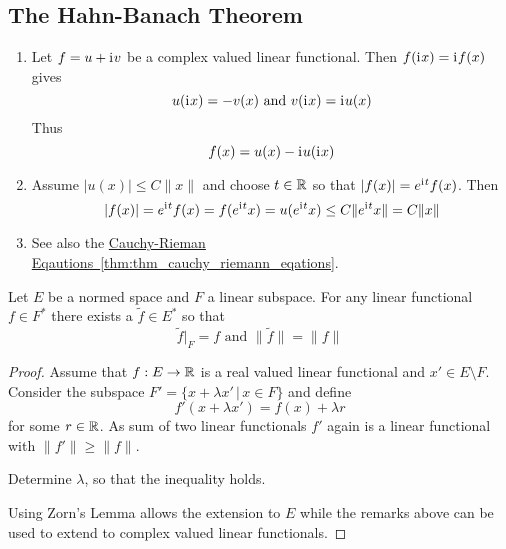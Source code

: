 \subsection{The Hahn-Banach Theorem}
\bigskip

\begin{remarks}
    \hfill
    \begin{enumerate}
        \item Let \( f = u + \mathrm{i}\mkern1mu v\) be a complex valued linear functional.
              Then \( f(\mathrm{i}\mkern1mu x) = \mathrm{i}\mkern1mu f(x) \) gives
              \[
                  u(\mathrm{i}\mkern1mu x) = -v(x) \text{ and } v(\mathrm{i}\mkern1mu x) = \mathrm{i}\mkern1mu u(x)
              \]
              Thus
              \[
                  f(x) = u(x) - \mathrm{i}\mkern1mu u(\mathrm{i}\mkern1mu x)
              \]
        \item Assume \( |u(x)| \le C\|x\| \) and choose \( t \in \mathbb{R} \) so that \( |f(x)| = e^{\mathrm{i}\mkern1mu t}f(x) \).
              Then
              \[
                  |f(x)| = e^{\mathrm{i}\mkern1mu t}f(x) = f(e^{\mathrm{i}\mkern1mu t}x) = u(e^{\mathrm{i}\mkern1mu t}x) \le C\|e^{\mathrm{i}\mkern1mu t}x\| = C\|x\|
              \]
        \item
              See also the \hyperref[thm:thm_cauchy_riemann_eqations]{Cauchy-Rieman
                  Eqautions~\ref*{thm:thm_cauchy_riemann_eqations}}.
    \end{enumerate}
\end{remarks}
\bigskip


\begin{theorem}\label{thm:hahn_banach}
    Let \( E \) be a normed space and \( F \) a linear subspace. For any linear functional
    \( f \in F^* \) there exists a \( \tilde{f} \in E^* \) so that
    \[
        \tilde{f}|_F = f \text{ and } \|\tilde{f}\| = \|f\|
    \]
\end{theorem}

\begin{proof}
    Assume that \( f: E \to \mathbb{R} \) is a real valued linear functional and \( x' \in E \setminus F \).
    Consider the subspace \( F' = \{x + \lambda x' \,|\, x \in F \} \) and define
    \[
        f'(x + \lambda x') = f(x) + \lambda r
    \]
    for some \( r \in \mathbb{R} \).  As sum of two linear functionals \( f' \) again is a linear functional with
    \( \|f'\| \ge \|f\| \).

    Determine \( \lambda \), so that the inequality holds.

    Using Zorn's Lemma allows the extension to \( E \) while the remarks above can be used to extend
    to complex valued linear functionals.
\end{proof}
\bigskip


